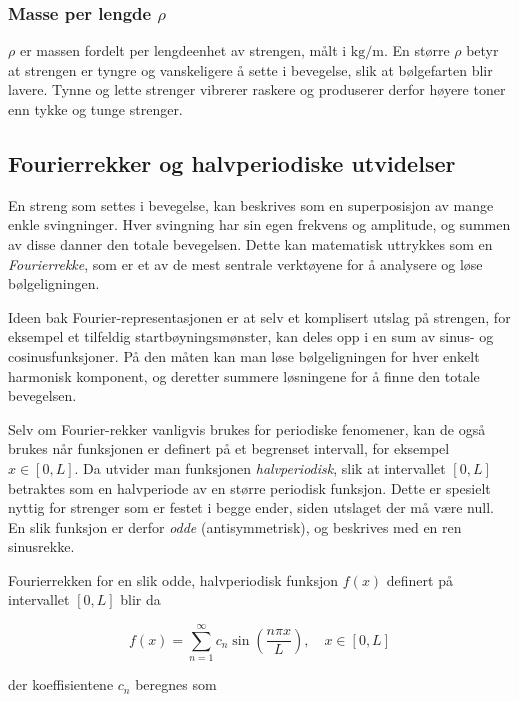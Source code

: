 \subsubsection{Masse per lengde \texorpdfstring{$\rho$}{rho}}
$\rho$ er massen fordelt per lengdeenhet av strengen, målt i $\text{kg/m}$. 
En større $\rho$ betyr at strengen er tyngre og vanskeligere å sette i bevegelse, slik at bølgefarten blir lavere. 
Tynne og lette strenger vibrerer raskere og produserer derfor høyere toner enn tykke og tunge strenger.

\subsection{Fourierrekker og halvperiodiske utvidelser}

En streng som settes i bevegelse, kan beskrives som en superposisjon av mange enkle svingninger.  
Hver svingning har sin egen frekvens og amplitude, og summen av disse danner den totale bevegelsen.  
Dette kan matematisk uttrykkes som en \textit{Fourierrekke}, som er et av de mest sentrale verktøyene for å analysere og løse bølgeligningen.  

Ideen bak Fourier-representasjonen er at selv et komplisert utslag på strengen, for eksempel et tilfeldig startbøyningsmønster, kan deles opp i en sum av sinus- og cosinusfunksjoner.  
På den måten kan man løse bølgeligningen for hver enkelt harmonisk komponent, og deretter summere løsningene for å finne den totale bevegelsen.  

Selv om Fourier-rekker vanligvis brukes for periodiske fenomener, kan de også brukes når funksjonen er definert på et begrenset intervall, for eksempel $x \in [0,L]$.  
Da utvider man funksjonen \textit{halvperiodisk}, slik at intervallet $[0,L]$ betraktes som en halvperiode av en større periodisk funksjon.  
Dette er spesielt nyttig for strenger som er festet i begge ender, siden utslaget der må være null.  
En slik funksjon er derfor \textit{odde} (antisymmetrisk), og beskrives med en ren sinusrekke. \parencite{intmathHalfRange}

Fourierrekken for en slik odde, halvperiodisk funksjon $f(x)$ definert på intervallet $[0,L]$ blir da

\begin{equation*}
f(x) = \sum_{n=1}^{\infty} c_n \sin\left(\frac{n\pi x}{L}\right), \quad x \in [0,L]
\end{equation*}

der koeffisientene $c_n$ beregnes som

